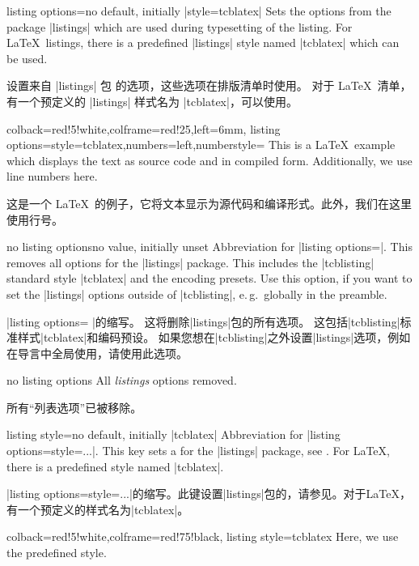 \begin{docTcbKey}{listing options}{=}{no default, initially |style=tcblatex|}
Sets the options from the package |listings| \cite{hoffmann:listings}
which are used during typesetting of the listing.
For \LaTeX\ listings, there is a predefined |listings| style named |tcblatex|
which can be used.

设置来自 |listings| 包 \cite{hoffmann:listings} 的选项，这些选项在排版清单时使用。 对于 \LaTeX\ 清单，有一个预定义的 |listings| 样式名为 |tcblatex|，可以使用。
\begin{dispExample}
\begin{tcblisting}{colback=red!5!white,colframe=red!25,left=6mm,
listing options={style=tcblatex,numbers=left,numberstyle=\tiny\color{red!75!black}}}
This is a \LaTeX\ example which displays the text as source code
and in compiled form. Additionally, we use line numbers here.

这是一个 \LaTeX\ 的例子，它将文本显示为源代码和编译形式。此外，我们在这里使用行号。
\end{tcblisting}
\end{dispExample}
\end{docTcbKey}


\begin{docTcbKey}{no listing options}{}{no value, initially unset}
Abbreviation for |listing options={}|.
This removes all options for the |listings| package.
This includes the |tcblisting| standard style |tcblatex| and the encoding presets.
Use this option, if you want to set the |listings| options outside of |tcblisting|, e.\,g.\ globally in
the preamble.

|listing options={} |的缩写。 这将删除|listings|包的所有选项。 这包括|tcblisting|标准样式|tcblatex|和编码预设。 如果您想在|tcblisting|之外设置|listings|选项，例如在导言中全局使用，请使用此选项。
\begin{dispExample}
\begin{tcblisting}{no listing options}
All \textit{listings} options removed.

所有“列表选项”已被移除。
\end{tcblisting}
\end{dispExample}
\end{docTcbKey}


\begin{docTcbKey}{listing style}{=}{no default, initially |tcblatex|}
Abbreviation for |listing options={style=...}|. This key sets a 
for the |listings| package, see \cite{hoffmann:listings}.
For \LaTeX, there is a predefined style named |tcblatex|.

|listing options={style=...}|的缩写。此键设置|listings|包的，请参见\cite{hoffmann:listings}。对于\LaTeX，有一个预定义的样式名为|tcblatex|。
\begin{dispExample}
\begin{tcblisting}{colback=red!5!white,colframe=red!75!black,
listing style=tcblatex}
Here, we use the predefined style.
\end{tcblisting}
\end{dispExample}
\end{docTcbKey}

